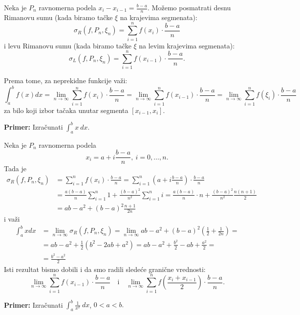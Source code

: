 \documentclass[a4paper,12pt,twoside]{report}
\numberwithin{algorithm}{section}
\begin{document}
    Neka je \(P_n\) ravnomerna podela \(x_i - x_{i-1} = \frac{b-a}{n}\). Možemo posmatrati desnu Rimanovu sumu (kada biramo tačke \(\xi\) na krajevima segmenata): \[\sigma_R(f, P_n, \xi_n) = \sum_{i=1}^n f(x_i) \cdot \frac{b-a}{n}\] i levu Rimanovu sumu (kada biramo tačke \(\xi\) na levim krajevima segmenata): \[\sigma_L(f, P_n, \xi_n) = \sum_{i=1}^n f(x_{i-1}) \cdot \frac{b-a}{n}.\]
    
    Prema tome, za neprekidne funkcije važi:
    \[
        \int_a^b f(x) dx = \lim_{n \to \infty} \sum_{i=1}^n f(x_i) \cdot \frac{b-a}{n} = \lim_{n \to \infty} \sum_{i=1}^n f(x_{i-1}) \cdot \frac{b-a}{n} = \lim_{n \to \infty} \sum_{i=1}^n f(\xi_i) \cdot \frac{b-a}{n}
    \]
    za bilo koji izbor tačaka unutar segmenta \([x_{i-1}, x_i]\).

\noindent\textbf{Primer:} Izračunati \(\int_a^b x \ dx.\)

Neka je \(P_n\) ravnomerna podela \[x_i = a + i\frac{b-a}{n},\ i=0, \dots, n.\]
Tada je
\begin{align*}
    \sigma_R(f, P_n, \xi_n) &= \sum_{i=1}^n f(x_i) \cdot \frac{b-a}{n} = \sum_{i=1}^n (a + i\frac{b-a}{n}) \cdot \frac{b-a}{n} \\
    &= \frac{a(b-a)}{n} \sum_{i=1}^n 1 + \frac{(b-a)^2}{n^2} \sum_{i=1}^n i = \frac{a(b-a)}{n} \cdot n + \frac{(b-a)^2}{n^2} \frac{n(n+1)}{2} \\
    &= ab - a^2 + (b-a)^2 \frac{n+1}{2n}
\end{align*}
i važi
\begin{align*}
    \int_a^b x dx &= \lim_{n \to \infty} \sigma_R(f, P_n, \xi_n) = \lim_{n \to \infty} ab - a^2 + (b-a)^2 \left(\frac{1}{2} + \frac{1}{2n}\right) = \\
    &= ab - a^2 + \frac{1}{2}(b^2 - 2ab + a^2) = ab - a^2 + \frac{b^2}{2} - ab + \frac{a^2}{2} = \\
    &= \frac{b^2 - a^2}{2}
\end{align*}
Isti rezultat bismo dobili i da smo radili sledeće granične vrednosti:
\[
    \lim_{n \to \infty} \sum_{i=1}^n f(x_{i-1}) \cdot \frac{b-a}{n} \quad \text{i} \quad \lim_{n \to \infty} \sum_{i=1}^n f\left(\frac{x_i + x_{i-1}}{2}\right) \cdot \frac{b-a}{n}.
\]

\noindent\textbf{Primer:} Izračunati \(\int_a^b \frac{1}{x^2} \ dx\), \(0 < a < b.\)
\end{document}
